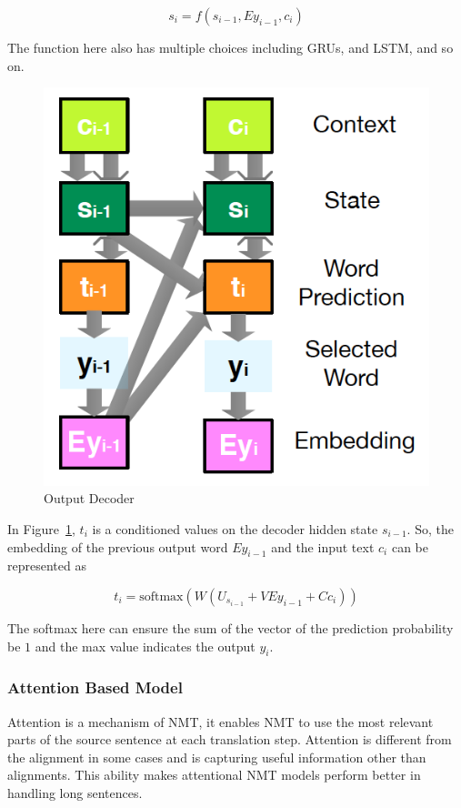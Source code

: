 \documentclass[a4paper, 12pt]{article}
\begin{document}
$$s_i = f(s_{i-1}, Ey_{i-1}, c_i)$$ 
 
The function here also has multiple choices including GRUs, and LSTM, and so on.

\begin{figure}
\centering
\includegraphics[scale=0.6]{rnn_2.png}
\caption{\label{fig:rnn2}Output Decoder}
\end{figure}

In Figure~\ref{fig:rnn2}, $t_i$ is a conditioned values on the decoder hidden state $s_{i-1}$. So, the embedding of the previous output word $Ey_{i-1}$ and the input text $c_i$ can be represented as 

$$t_i = \text{softmax}(W(U_{s_{i-1}}+VEy_{i-1}+Cc_i))$$

The softmax here can ensure the sum of the vector of the prediction probability be $1$ and the max value indicates the output $y_i$.

\subsubsection{Attention Based Model}
Attention is a mechanism of NMT, it enables NMT to use the most relevant parts of the source sentence at each translation step. Attention is different from the alignment in some cases and is capturing useful information other than alignments\cite{ghader2017does}. This ability makes attentional NMT models perform better in handling long sentences.
\end{document}
